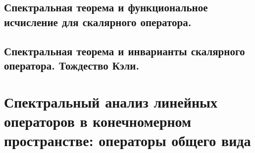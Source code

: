 \subsection{Спектральная теорема и функциональное исчисление для скалярного оператора.}

\subsection{Спектральная теорема и инварианты скалярного оператора. Тождество Кэли.}



\section{Спектральный анализ линейных операторов в конечномерном пространстве: операторы общего вида}


